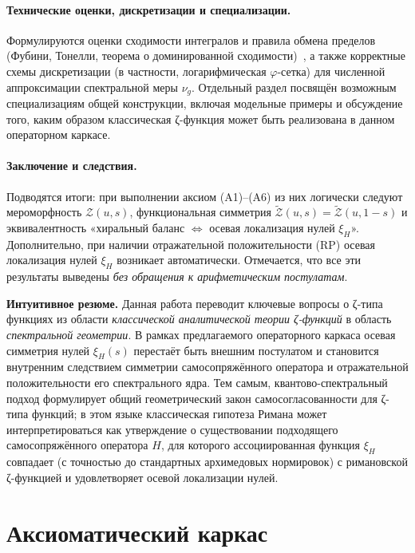\documentclass{article}
\numberwithin{equation}{section}
\theoremstyle{plain}
\theoremstyle{definition}
\theoremstyle{remark}
\def\Leftrightarrow{⇔}%
\begin{document}
\paragraph{Технические оценки, дискретизации и специализации.}
Формулируются оценки сходимости интегралов и правила обмена пределов
(Фубини, Тонелли, теорема о доминированной сходимости)~\cite{Folland1999},
а также корректные схемы дискретизации
(в частности, логарифмическая $\varphi$-сетка)
для численной аппроксимации спектральной меры $\nu_g$.
Отдельный раздел посвящён возможным специализациям общей конструкции,
включая модельные примеры и обсуждение того,
каким образом классическая ζ-функция может быть реализована
в данном операторном каркасе.

\paragraph{Заключение и следствия.}
Подводятся итоги: при выполнении аксиом (A1)–(A6)
из них логически следуют мероморфность $\mathcal Z(u,s)$,
функциональная симметрия
$\widetilde{\mathcal Z}(u,s)=\widetilde{\mathcal Z}(u,1-s)$
и эквивалентность
«хиральный баланс $\Leftrightarrow$ осевая локализация нулей $\xi_H$».
Дополнительно, при наличии отражательной положительности (RP)
осевая локализация нулей $\xi_H$ возникает автоматически.
Отмечается, что все эти результаты выведены
\emph{без обращения к арифметическим постулатам}.

\bigskip
\noindent
\textbf{Интуитивное резюме.}
Данная работа переводит ключевые вопросы о ζ-типа функциях
из области \emph{классической аналитической теории ζ-функций}
в область \emph{спектральной геометрии}.
В рамках предлагаемого операторного каркаса
осевая симметрия нулей $\xi_H(s)$ перестаёт быть внешним постулатом
и становится внутренним следствием симметрии самосопряжённого оператора
и отражательной положительности его спектрального ядра.
Тем самым, квантово-спектральный подход формулирует общий
геометрический закон самосогласованности для ζ-типа функций;
в этом языке классическая гипотеза Римана может интерпретироваться
как утверждение о существовании подходящего самосопряжённого оператора $H$,
для которого ассоциированная функция $\xi_H$ совпадает
(с точностью до стандартных архимедовых нормировок)
с римановской ζ-функцией и удовлетворяет осевой локализации нулей.

\clearpage

\section{Аксиоматический каркас}
\label{sec:axioms}
\end{document}
